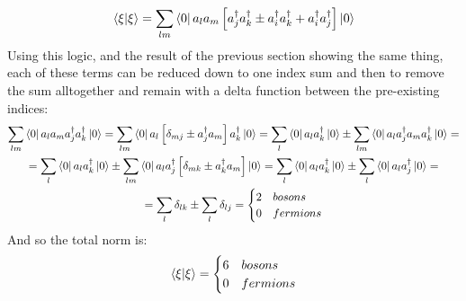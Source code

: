 \documentclass{article}
\begin{document}
\begin{equation}
    \braket{\xi}{\xi} = \sum_{lm}\bra{0}a_la_m \left[
        a_j^\dagger a_k^\dagger \pm a_i^\dagger a_k^\dagger + a_i^\dagger a_j^\dagger
    \right] \ket{0}
\end{equation}
Using this logic, and the result of the previous section showing the same thing, each of these terms can be reduced down to one index sum and then to remove the sum alltogether and remain with a delta function between the pre-existing indices:
\begin{equation}
\begin{gathered}
    \sum_{lm}\bra{0}a_la_m a_j^\dagger a_k^\dagger\ket{0} = 
    \sum_{lm}\bra{0}a_l\left[\delta_{mj} \pm a_j^\dagger a_m\right] a_k^\dagger\ket{0} = 
    \sum_{l}\bra{0}a_l a_k^\dagger\ket{0} \pm
    \sum_{lm}\bra{0}a_la_j^\dagger a_m a_k^\dagger\ket{0} = \\ =
    \sum_{l}\bra{0}a_l a_k^\dagger\ket{0} \pm
    \sum_{lm}\bra{0}a_la_j^\dagger \left[\delta_{mk} \pm a_k^\dagger a_m\right]\ket{0} = 
    \sum_{l}\bra{0}a_l a_k^\dagger\ket{0} \pm
    \sum_{l}\bra{0}a_la_j^\dagger \ket{0} = \\ =
    \sum_{l}\delta_{lk} \pm \sum_{l}\delta_{lj} = \begin{cases}
        2 & bosons \\ 0 & fermions
    \end{cases}
\end{gathered}
\end{equation}
And so the total norm is:
\begin{equation}
    \braket{\xi}{\xi} = \begin{cases}
        6 & bosons \\ 0 & fermions
    \end{cases}
\end{equation}
\end{document}

